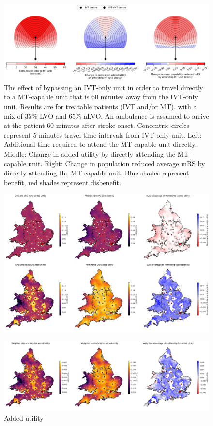 \begin{figure}
\centering
\includegraphics[width=1.0\textwidth]{./images/circle_plots_t-IVT-to-MT=60_t-onset-to-ambo=60}
\caption{The effect of bypassing an IVT-only unit in order to travel directly to a MT-capable unit that is 60 minutes away from the IVT-only unit. Results are for treatable patients (IVT and/or MT), with a mix of 35\% LVO and 65\% nLVO. An ambulance is assumed to arrive at the patient 60 minutes after stroke onset. Concentric circles represent 5 minutes travel time intervals from IVT-only unit. Left: Additional time required to attend the MT-capable unit  directly. Middle: Change in added utility by directly attending the MT-capable unit. Right: Change in population reduced average mRS by directly attending the MT-capable unit. Blue shades represent benefit, red shades represent disbenefit.}
\label{fig:added_utility_six_in_one}
\end{figure}

\begin{figure}
\centering
\includegraphics[width=1.0\textwidth]{./maps/added_utility_six_in_one}
\caption{}
\label{fig:added_utility_six_in_one}
\end{figure}

\begin{figure}
\centering
\includegraphics[width=1.0\textwidth]{./maps/added_utility_weighted_results}
\caption{Added utility }
\label{fig:added_utility_six_in_one}
\end{figure}